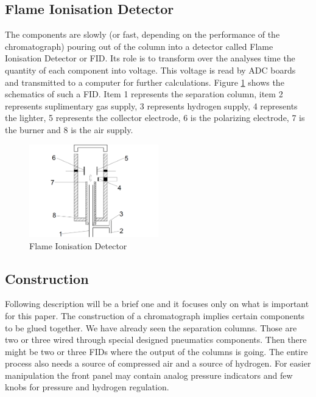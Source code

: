 \documentclass[conference]{IEEEtran}
\begin{document}
\subsection{Flame Ionisation Detector}

    The components are slowly (or fast, depending on the performance of the chromatograph) pouring out of the column
    into a detector called Flame Ionisation Detector or FID. Its role is to transform over the analyses time the quantity
    of each component into voltage. This voltage is read by ADC boards and transmitted to a computer for further calculations.
    Figure \ref{fig:fid} shows the schematics of such a FID. Item 1 represents the separation column, item 2 represents suplimentary
    gas supply, 3 represents hydrogen supply, 4 represents the lighter, 5 represents the collector electrode, 6 is the
    polarizing electrode, 7 is the burner and 8 is the air supply.

    \begin{figure}
        \centering
        \includegraphics[width=0.5\textwidth]{fid.png}
        \caption{Flame Ionisation Detector}
        \label{fig:fid}
    \end{figure}

\subsection{Construction}
    
    Following description will be a brief one and it focuses only on what is important for this paper. The construction of a 
    chromatograph implies certain components to be glued together. We have already seen the separation columns. Those are 
    two or three wired through special designed pneumatics components. Then there might be two or three FIDs where the
    output of the columns is going. The entire process also needs a source of compressed air and a source of hydrogen. For
    easier manipulation the front panel may contain analog pressure indicators and few knobs for pressure and hydrogen
    regulation.
\end{document}
